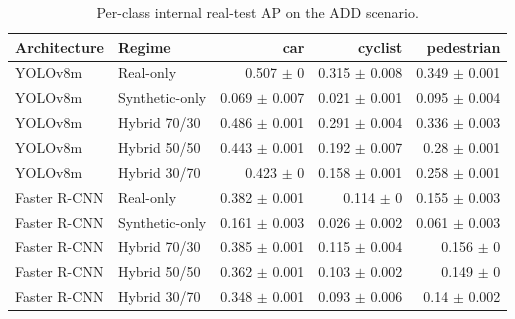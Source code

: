 \begin{table}
\caption{Per-class internal real-test AP on the ADD scenario.}
\label{tab:add_class_ap}
\begin{tabular}{llrrr}
\toprule
Architecture & Regime & car & cyclist & pedestrian \\
\midrule
YOLOv8m & Real-only & 0.507 $\pm$ 0 & 0.315 $\pm$ 0.008 & 0.349 $\pm$ 0.001 \\
YOLOv8m & Synthetic-only & 0.069 $\pm$ 0.007 & 0.021 $\pm$ 0.001 & 0.095 $\pm$ 0.004 \\
YOLOv8m & Hybrid 70/30 & 0.486 $\pm$ 0.001 & 0.291 $\pm$ 0.004 & 0.336 $\pm$ 0.003 \\
YOLOv8m & Hybrid 50/50 & 0.443 $\pm$ 0.001 & 0.192 $\pm$ 0.007 & 0.28 $\pm$ 0.001 \\
YOLOv8m & Hybrid 30/70 & 0.423 $\pm$ 0 & 0.158 $\pm$ 0.001 & 0.258 $\pm$ 0.001 \\
Faster R-CNN & Real-only & 0.382 $\pm$ 0.001 & 0.114 $\pm$ 0 & 0.155 $\pm$ 0.003 \\
Faster R-CNN & Synthetic-only & 0.161 $\pm$ 0.003 & 0.026 $\pm$ 0.002 & 0.061 $\pm$ 0.003 \\
Faster R-CNN & Hybrid 70/30 & 0.385 $\pm$ 0.001 & 0.115 $\pm$ 0.004 & 0.156 $\pm$ 0 \\
Faster R-CNN & Hybrid 50/50 & 0.362 $\pm$ 0.001 & 0.103 $\pm$ 0.002 & 0.149 $\pm$ 0 \\
Faster R-CNN & Hybrid 30/70 & 0.348 $\pm$ 0.001 & 0.093 $\pm$ 0.006 & 0.14 $\pm$ 0.002 \\
\bottomrule
\end{tabular}
\end{table}
